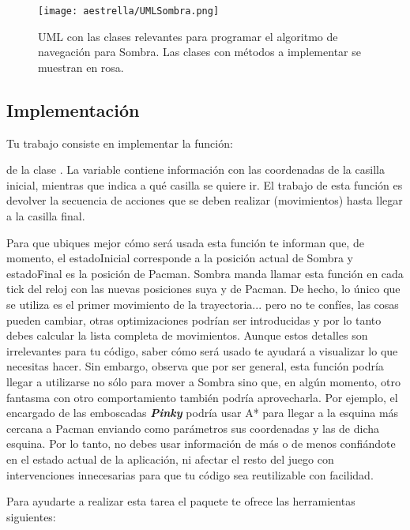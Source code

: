 \begin{sidewaysfigure}
  \centering
  \texttt{[image: aestrella/UMLSombra.png]}
  \caption{UML con las clases relevantes para programar el algoritmo de navegación para Sombra.  Las clases con métodos a implementar se muestran en rosa.}
  \label{fig:umlestrella}
\end{sidewaysfigure}

\subsection{Implementaci\'on}

Tu trabajo consiste en implementar la función:


\noindent de la clase .
La variable  contiene información con las coordenadas de la casilla inicial, mientras que  indica a qué casilla se quiere ir.  El trabajo de esta función es devolver la secuencia de acciones que se deben realizar (movimientos) hasta llegar a la casilla final.

Para que ubiques mejor cómo será usada esta función te informan que, de momento, el estadoInicial corresponde a la posición actual de Sombra y estadoFinal es la posición de Pacman.  Sombra manda llamar esta función en cada tick del reloj con las nuevas posiciones suya y de Pacman.  De hecho, lo único que se utiliza es el primer movimiento de la trayectoria... pero no te confíes, las cosas pueden cambiar, otras optimizaciones podrían ser introducidas y por lo tanto debes calcular la lista completa de movimientos.  Aunque estos detalles son irrelevantes para tu código, saber cómo será usado te ayudará a visualizar lo que necesitas hacer.  Sin embargo, observa que por ser general, esta función podría llegar a utilizarse no sólo para mover a Sombra sino que, en algún momento, otro fantasma con otro comportamiento también podría aprovecharla.  Por ejemplo, el encargado de las emboscadas \textbf{\textit{Pinky}} podría usar A* para llegar a la esquina más cercana a Pacman enviando como parámetros sus coordenadas y las de dicha esquina.  Por lo tanto, no debes usar información de más o de menos confiándote en el estado actual de la aplicación, ni afectar el resto del juego con intervenciones innecesarias para que tu código sea reutilizable con facilidad.

Para ayudarte a realizar esta tarea el paquete te ofrece las herramientas siguientes:

